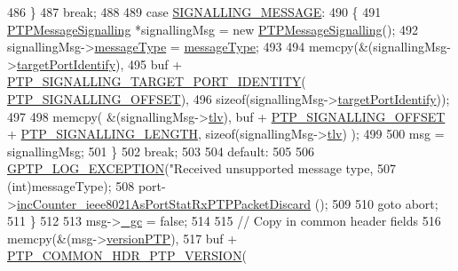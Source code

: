 \begin{DoxyCode}
{{{{{{{{486         \}
487         \textcolor{keywordflow}{break};
488 
489     \textcolor{keywordflow}{case} \hyperlink{avbts__message_8hpp_ac6606ebe91c8ac66a2c314c79f5ab013a126e822073ff23ccb061021926a152a3}{SIGNALLING\_MESSAGE}:
490         \{
491             \hyperlink{class_p_t_p_message_signalling}{PTPMessageSignalling} *signallingMsg = \textcolor{keyword}{new} 
      \hyperlink{class_p_t_p_message_signalling}{PTPMessageSignalling}();
492             signallingMsg->\hyperlink{class_p_t_p_message_common_adb32627aa5b0e2dbad3ccd88aab07c05}{messageType} = \hyperlink{class_p_t_p_message_common_adb32627aa5b0e2dbad3ccd88aab07c05}{messageType};
493 
494             memcpy(&(signallingMsg->\hyperlink{class_p_t_p_message_signalling_a1d4353212906ed7366ffbf01cb56bdab}{targetPortIdentify}),
495                    buf + \hyperlink{avbts__message_8hpp_a068292a37a4f0716f4b6ba81222fb9a5}{PTP\_SIGNALLING\_TARGET\_PORT\_IDENTITY}(
      \hyperlink{avbts__message_8hpp_a3528ebe88df8c782038079cb1165d540}{PTP\_SIGNALLING\_OFFSET}),
496                    \textcolor{keyword}{sizeof}(signallingMsg->\hyperlink{class_p_t_p_message_signalling_a1d4353212906ed7366ffbf01cb56bdab}{targetPortIdentify}));
497 
498             memcpy( &(signallingMsg->\hyperlink{class_p_t_p_message_signalling_ab458dc952682abd8077ce12fbff3d1d6}{tlv}), buf + \hyperlink{avbts__message_8hpp_a3528ebe88df8c782038079cb1165d540}{PTP\_SIGNALLING\_OFFSET} + 
      \hyperlink{avbts__message_8hpp_ac728b0caa27d25b33564be179caa3ffd}{PTP\_SIGNALLING\_LENGTH}, \textcolor{keyword}{sizeof}(signallingMsg->\hyperlink{class_p_t_p_message_signalling_ab458dc952682abd8077ce12fbff3d1d6}{tlv}) );
499 
500             msg = signallingMsg;
501         \}
502         \textcolor{keywordflow}{break};
503 
504     \textcolor{keywordflow}{default}:
505 
506         \hyperlink{gptp__log_8hpp_a5c9d2f25d8d69eb2e585b35c72896357}{GPTP\_LOG\_EXCEPTION}(\textcolor{stringliteral}{"Received unsupported message type, %
507                     (\textcolor{keywordtype}{int})messageType);
508         port->\hyperlink{class_common_port_ab127287dc3c8d4bed5595b456ba4b17d}{incCounter\_ieee8021AsPortStatRxPTPPacketDiscard}
      ();
509 
510         \textcolor{keywordflow}{goto} abort;
511     \}
512 
513     msg->\hyperlink{class_p_t_p_message_common_a1b15d1687680708819ead19f82a970a9}{\_gc} = \textcolor{keyword}{false};
514 
515     \textcolor{comment}{// Copy in common header fields}
516     memcpy(&(msg->\hyperlink{class_p_t_p_message_common_aebd1e0693c6170ff1b08b2471db92a80}{versionPTP}),
517            buf + \hyperlink{avbts__message_8hpp_a4b78a578ef002737321ef5c6def6593e}{PTP\_COMMON\_HDR\_PTP\_VERSION}(
}}}}}}}}}
\end{DoxyCode}
